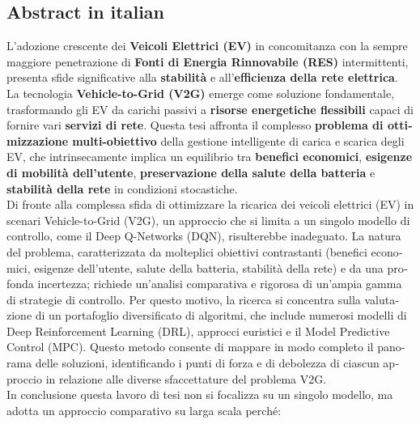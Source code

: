 \documentclass[a4paper,12pt]{report}
\begin{document}
\tableofcontents
\newpage
\begin{otherlanguage}{italian}
\section*{Abstract in italian}

L'adozione crescente dei \textbf{Veicoli Elettrici (EV)} in concomitanza con la sempre maggiore penetrazione di \textbf{Fonti di Energia Rinnovabile (RES)} intermittenti, presenta sfide significative alla \textbf{stabilità} e all'\textbf{efficienza della rete elettrica}. La tecnologia \textbf{Vehicle-to-Grid (V2G)} emerge come soluzione fondamentale, trasformando gli EV da carichi passivi a \textbf{risorse energetiche flessibili} capaci di fornire vari \textbf{servizi di rete}. Questa tesi affronta il complesso \textbf{problema di ottimizzazione multi-obiettivo} della gestione intelligente di carica e scarica degli EV, che intrinsecamente implica un equilibrio tra \textbf{benefici economici}, \textbf{esigenze di mobilità dell'utente}, \textbf{preservazione della salute della batteria} e \textbf{stabilità della rete} in condizioni stocastiche.
\\
Di fronte alla complessa sfida di ottimizzare la ricarica dei veicoli elettrici (EV) in scenari Vehicle-to-Grid (V2G), un approccio che si limita a un singolo modello di controllo, come il Deep Q-Networks (DQN), risulterebbe inadeguato. La natura del problema, caratterizzata da molteplici obiettivi contrastanti (benefici economici, esigenze dell'utente, salute della batteria, stabilità della rete) e da una profonda incertezza; richiede un'analisi comparativa e rigorosa di un'ampia gamma di strategie di controllo.
Per questo motivo, la ricerca si concentra sulla valutazione di un portafoglio diversificato di algoritmi, che include numerosi modelli di Deep Reinforcement Learning (DRL), approcci euristici e il Model Predictive Control (MPC). Questo metodo consente di mappare in modo completo il panorama delle soluzioni, identificando i punti di forza e di debolezza di ciascun approccio in relazione alle diverse sfaccettature del problema V2G.
\\
In conclusione questa lavoro di tesi non si focalizza su un singolo modello, ma adotta un approccio comparativo su larga scala perché:

\end{otherlanguage}
\end{document}
